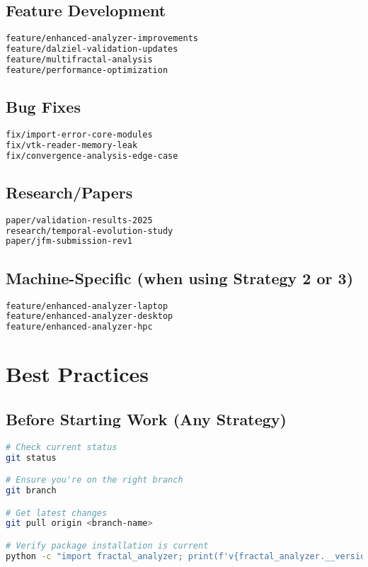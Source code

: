 \documentclass[11pt,letterpaper]{article}
\begin{document}
\subsection{Feature Development}
\begin{lstlisting}[language=bash]
feature/enhanced-analyzer-improvements
feature/dalziel-validation-updates
feature/multifractal-analysis
feature/performance-optimization
\end{lstlisting}

\subsection{Bug Fixes}
\begin{lstlisting}[language=bash]
fix/import-error-core-modules
fix/vtk-reader-memory-leak
fix/convergence-analysis-edge-case
\end{lstlisting}

\subsection{Research/Papers}
\begin{lstlisting}[language=bash]
paper/validation-results-2025
research/temporal-evolution-study
paper/jfm-submission-rev1
\end{lstlisting}

\subsection{Machine-Specific (when using Strategy 2 or 3)}
\begin{lstlisting}[language=bash]
feature/enhanced-analyzer-laptop
feature/enhanced-analyzer-desktop
feature/enhanced-analyzer-hpc
\end{lstlisting}

\section{Best Practices}

\subsection{Before Starting Work (Any Strategy)}
\begin{lstlisting}[language=bash]
# Check current status
git status

# Ensure you're on the right branch
git branch

# Get latest changes
git pull origin <branch-name>

# Verify package installation is current
python -c "import fractal_analyzer; print(f'v{fractal_analyzer.__version__}')"
\end{lstlisting}
\end{document}
